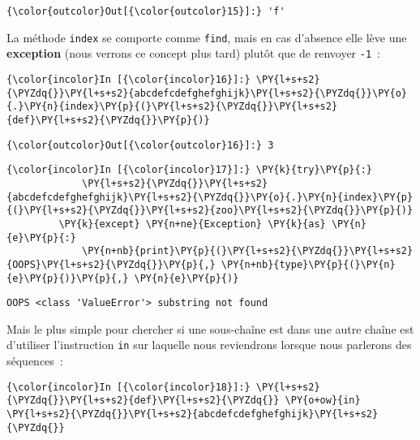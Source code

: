 \begin{Verbatim}[commandchars=\\\{\}]
{\color{outcolor}Out[{\color{outcolor}15}]:} 'f'
\end{Verbatim}
            
    La méthode \texttt{index} se comporte comme \texttt{find}, mais en cas
d'absence elle lève une \textbf{exception} (nous verrons ce concept plus
tard) plutôt que de renvoyer \texttt{-1}~:

    \begin{Verbatim}[commandchars=\\\{\}]
{\color{incolor}In [{\color{incolor}16}]:} \PY{l+s+s2}{\PYZdq{}}\PY{l+s+s2}{abcdefcdefghefghijk}\PY{l+s+s2}{\PYZdq{}}\PY{o}{.}\PY{n}{index}\PY{p}{(}\PY{l+s+s2}{\PYZdq{}}\PY{l+s+s2}{def}\PY{l+s+s2}{\PYZdq{}}\PY{p}{)}
\end{Verbatim}


\begin{Verbatim}[commandchars=\\\{\}]
{\color{outcolor}Out[{\color{outcolor}16}]:} 3
\end{Verbatim}
            
    \begin{Verbatim}[commandchars=\\\{\}]
{\color{incolor}In [{\color{incolor}17}]:} \PY{k}{try}\PY{p}{:}
             \PY{l+s+s2}{\PYZdq{}}\PY{l+s+s2}{abcdefcdefghefghijk}\PY{l+s+s2}{\PYZdq{}}\PY{o}{.}\PY{n}{index}\PY{p}{(}\PY{l+s+s2}{\PYZdq{}}\PY{l+s+s2}{zoo}\PY{l+s+s2}{\PYZdq{}}\PY{p}{)}
         \PY{k}{except} \PY{n+ne}{Exception} \PY{k}{as} \PY{n}{e}\PY{p}{:}
             \PY{n+nb}{print}\PY{p}{(}\PY{l+s+s2}{\PYZdq{}}\PY{l+s+s2}{OOPS}\PY{l+s+s2}{\PYZdq{}}\PY{p}{,} \PY{n+nb}{type}\PY{p}{(}\PY{n}{e}\PY{p}{)}\PY{p}{,} \PY{n}{e}\PY{p}{)}
\end{Verbatim}


    \begin{Verbatim}[commandchars=\\\{\}]
OOPS <class 'ValueError'> substring not found

    \end{Verbatim}

    Mais le plus simple pour chercher si une sous-chaîne est dans une autre
chaîne est d'utiliser l'instruction \texttt{in} sur laquelle nous
reviendrons lorsque nous parlerons des séquences~:

    \begin{Verbatim}[commandchars=\\\{\}]
{\color{incolor}In [{\color{incolor}18}]:} \PY{l+s+s2}{\PYZdq{}}\PY{l+s+s2}{def}\PY{l+s+s2}{\PYZdq{}} \PY{o+ow}{in} \PY{l+s+s2}{\PYZdq{}}\PY{l+s+s2}{abcdefcdefghefghijk}\PY{l+s+s2}{\PYZdq{}}
\end{Verbatim}


